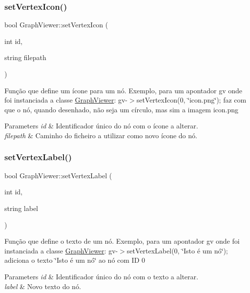 \subsubsection{\texorpdfstring{set\+Vertex\+Icon()}{setVertexIcon()}}
{\footnotesize\ttfamily bool Graph\+Viewer\+::set\+Vertex\+Icon (\begin{DoxyParamCaption}\item[{int}]{id,  }\item[{string}]{filepath }\end{DoxyParamCaption})}

Função que define um ícone para um nó. Exemplo, para um apontador gv onde foi instanciada a classe \hyperlink{class_graph_viewer}{Graph\+Viewer}\+: gv-\/$>$set\+Vertex\+Icon(0, \char`\"{}icon.\+png\char`\"{}); faz com que o nó, quando desenhado, não seja um círculo, mas sim a imagem icon.\+png


\begin{DoxyParams}{Parameters}
{\em id} & Identificador único do nó com o ícone a alterar. \\
\hline
{\em filepath} & Caminho do ficheiro a utilizar como novo ícone do nó. \\
\hline
\end{DoxyParams}
\hypertarget{class_graph_viewer_ac25d7d007022fda16799808ba136e909}{}\label{class_graph_viewer_ac25d7d007022fda16799808ba136e909} 
\subsubsection{\texorpdfstring{set\+Vertex\+Label()}{setVertexLabel()}}
{\footnotesize\ttfamily bool Graph\+Viewer\+::set\+Vertex\+Label (\begin{DoxyParamCaption}\item[{int}]{id,  }\item[{string}]{label }\end{DoxyParamCaption})}

Função que define o texto de um nó. Exemplo, para um apontador gv onde foi instanciada a classe \hyperlink{class_graph_viewer}{Graph\+Viewer}\+: gv-\/$>$set\+Vertex\+Label(0, \char`\"{}\+Isto é um nó\char`\"{}); adiciona o texto \char`\"{}\+Isto é um nó\char`\"{} ao nó com ID 0


\begin{DoxyParams}{Parameters}
{\em id} & Identificador único do nó com o texto a alterar. \\
\hline
{\em label} & Novo texto do nó. \\
\hline
\end{DoxyParams}
\hypertarget{class_graph_viewer_ae930dfdfcdeb7a871eefb6028d74b9f9}{}\label{class_graph_viewer_ae930dfdfcdeb7a871eefb6028d74b9f9} 
